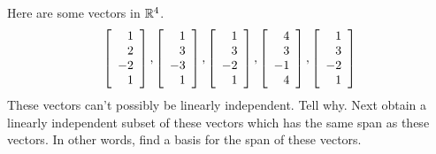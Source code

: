 \begin{enumialphparenastyle}
\begin{ex} Here are some vectors in $\mathbb{R}^{4}$. 
\begin{equation*}
\left[ 
\begin{array}{r}
1 \\ 
2 \\ 
-2 \\ 
1
\end{array}
\right] ,\left[ 
\begin{array}{r}
1 \\ 
3 \\ 
-3 \\ 
1
\end{array}
\right] ,\left[ 
\begin{array}{r}
1 \\ 
3 \\ 
-2 \\ 
1
\end{array}
\right] ,\left[ 
\begin{array}{r}
4 \\ 
3 \\ 
-1 \\ 
4
\end{array}
\right] ,\left[ 
\begin{array}{r}
1 \\ 
3 \\ 
-2 \\ 
1
\end{array}
\right]
\end{equation*}
These vectors can't possibly be linearly independent. Tell why. Next obtain a
linearly independent subset of these vectors which has the same span as
these vectors. In other words, find a basis for the span of these vectors.
\end{ex}


\end{enumialphparenastyle}
